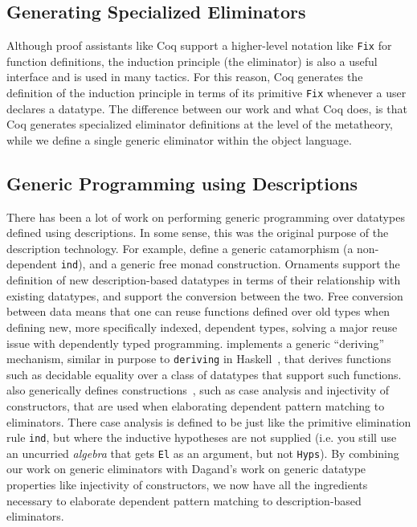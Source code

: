 \documentclass[preprint,nonatbib]{sigplanconf}
\begin{document}
\subsection{Generating Specialized Eliminators}

Although proof assistants like {\sc Coq} support a higher-level
notation like {\tt Fix} for function definitions, the induction
principle (the eliminator) is also a useful interface and is used in 
many tactics. For this reason, {\sc Coq} generates the definition
of the induction principle in terms of its primitive {\tt Fix}
whenever a user declares a datatype. The difference between our work
and what {\sc Coq} does,  is that {\sc Coq} generates
specialized eliminator definitions at the level of the metatheory,
while we define a single generic eliminator within the object
language.

\subsection{Generic Programming using Descriptions}

There has been a lot of work on performing generic programming over
datatypes defined using descriptions. In some sense, this was the original
purpose of the description technology. For example,
\citet{Chapman:2010:GAL:1932681.1863547} define a generic catamorphism
(a non-dependent {\tt ind}), and a generic free monad construction.
Ornaments \citep{mcbride2010ornamental} support the definition of new
description-based datatypes in terms of their relationship with
existing datatypes, and support the conversion between the two. Free
conversion between data means that one can reuse functions defined
over old types when defining new, more specifically indexed, dependent
types, solving a major reuse issue with dependently typed programming.
\citet{dagand:phd} implements a generic ``deriving'' mechanism,
similar in purpose to {\tt deriving} in
{\sc Haskell}~\citep{jones2003haskell}, that derives
functions such as decidable equality over a class of datatypes that
support such functions. \citet{dagand:phd} also generically defines
constructions~\citep{mcbride2006few}, such as case
analysis and injectivity of constructors, that are used when
elaborating dependent pattern matching to eliminators. There
case analysis is defined to be just like the primitive elimination
rule {\tt ind}, but where the inductive hypotheses are not supplied
(i.e. you still use an uncurried {\it algebra} that gets {\tt El} as
an argument, but not {\tt Hyps}). By combining our work on generic
eliminators with Dagand's work on generic datatype properties like
injectivity of constructors, we now have all the ingredients necessary to
elaborate dependent pattern matching to description-based eliminators.
\end{document}
